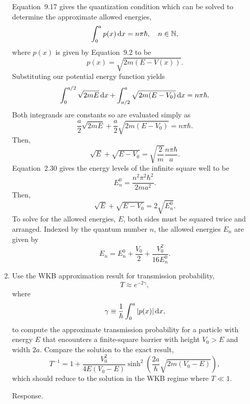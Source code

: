\documentclass[a4paper, 12pt]{config/homework}
\begin{document}
\begin{enumerate}
\bigskip
Equation~9.17 gives the quantization condition which can be solved to determine the approximate allowed energies,
\[\int_{0}^{a}{p(x) \, \text{d}x}=n\pi\hbar, \quad n\in\mathbb{N},\]
where \(p(x)\) is given by Equation~9.2 to be
\[p(x) = \sqrt{2m\left(E-V(x)\right)}.\]
Substituting our potential energy function yields
\[\int_{0}^{a/2}{\sqrt{2mE} \, \text{d}x} + \int_{a/2}^{a}{\sqrt{2m(E-V_0)} \, \text{d}x} = n\pi\hbar.\]
Both integrands are constants so are evaluated simply as
\[\frac{a}{2}\sqrt{2mE} + \frac{a}{2}\sqrt{2m(E-V_0)} = n\pi\hbar.\]
Then,
\[\sqrt{E} + \sqrt{E-V_0} = \sqrt{\frac{2}{m}}\frac{n\pi\hbar}{a}.\]
Equation~2.30 gives the energy levels of the infinite square well to be
\[E_n^0 = \frac{n^2\pi^2\hbar^2}{2ma^2}.\]
Then,
\[\sqrt{E}+\sqrt{E-V_0} = 2\sqrt{E_n^0}.\]
To solve for the allowed energies, \(E\), both sides must be squared twice and arranged. Indexed by the quantum number \(n\), the allowed energies \(E_n\) are given by
\[E_n = E_n^0 + \frac{V_0}{2} + \frac{V_0^2}{16 E_n^0}.\]


\pagebreak
\item Use the WKB approximation result for transmission probability,
\[T \approx e^{-2\gamma},\]
where
\[\gamma \equiv \frac{1}{\hbar}\int_{0}^{a}{|p(x)| \, \text{d}x},\]
to compute the approximate transmission probability for a particle with energy \(E\) that encounters a finite-square barrier with height \(V_0 > E\) and width \(2a\). Compare the solution to the exact result,
\[T^{-1} = 1 + \frac{V_0^2}{4E(V_0-E)}\sinh^2\left(\frac{2a}{\hbar}\sqrt{2m(V_0-E)}\right),\]
which should reduce to the solution in the WKB regime where \(T\ll 1\).

\bigskip
Response.

\end{enumerate}
\end{document}
